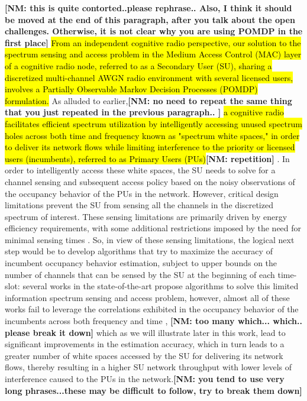 \documentclass[12pt, draftcls, onecolumn]{IEEEtran}
\newcommand{\nm}[1]{{\color{blue}\bf{[NM: #1]}}}
\begin{document}
\nm{this is quite contorted..please rephrase.. Also, I think it should be moved at the end of this paragraph, after you talk about the open challenges. Otherwise, it is not clear why you are using POMDP in the first place}
\hl{From an independent cognitive radio perspective, our solution to the spectrum sensing and access problem in the Medium Access Control (MAC) layer of a cognitive radio node, referred to as a Secondary User (SU), sharing a discretized multi-channel AWGN radio environment with several licensed users, involves a Partially Observable Markov Decision Processes (POMDP) formulation.} As alluded to earlier,\nm{no need to repeat the same thing that you just repeated in the previous paragraph.. } \hl{a cognitive radio facilitates efficient spectrum utilization by intelligently accessing unused spectrum holes across both time and frequency known as "spectrum white spaces," in order to deliver its network flows while limiting interference to the priority or licensed users (incumbents), referred to as Primary Users (PUs)}\nm{repetition} \cite{WCL:2}. In order to intelligently access these white spaces, the SU needs to solve for a channel sensing and subsequent access policy based on the noisy observations of the occupancy behavior of the PUs in the network. However, critical design limitations prevent the SU from sensing all the channels in the discretized spectrum of interest. These sensing limitations are primarily driven by energy efficiency requirements, with some additional restrictions imposed by the need for minimal sensing times \cite{WCL:3}. So, in view of these sensing limitations, the logical next step would be to develop algorithms that try to maximize the accuracy of incumbent occupancy behavior estimation, subject to upper bounds on the number of channels that can be sensed by the SU at the beginning of each time-slot: several works in the state-of-the-art \cite{WCL:4, WCL:5, WCL:6, WCL:7} propose algorithms to solve this limited information spectrum sensing and access problem, however, almost all of these works \cite{WCL:4, WCL:5, WCL:8, WCL:9, WCL:10, WCL:11} fail to leverage the correlations exhibited in the occupancy behavior of the incumbents across both frequency and time \cite{WCL:12},
\nm{too many which... which.. please break it down}
 which as we will illustrate later in this work, lead to significant improvements in the estimation accuracy, which in turn leads to a greater number of white spaces accessed by the SU for delivering its network flows, thereby resulting in a higher SU network throughput with lower levels of interference caused to the PUs in the network.\nm{you tend to use very long phrases...these may be difficult to follow, try to break them down}
\end{document}
